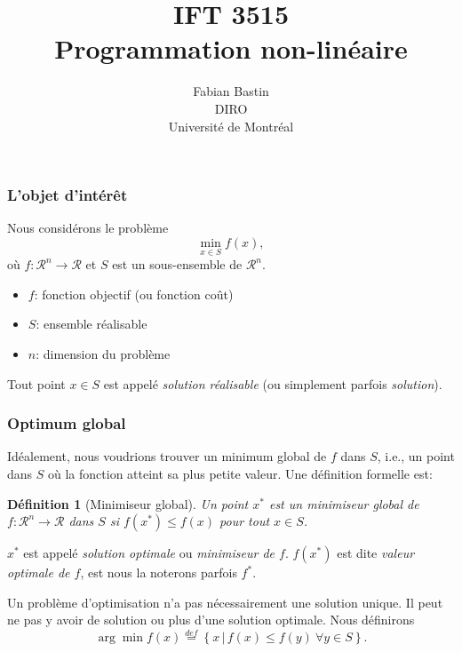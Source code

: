 \documentclass[usepdftitle=false]{beamer}
\title[IFT3515]{IFT 3515\\Programmation non-linéaire}
\author[Fabian Bastin]{Fabian Bastin\\DIRO\\Université de Montréal}
\date{}
\def\red{\color{red}}
\def\rit{\mathcal{R}}
\newtheorem{defn}{Définition}
\begin{document}
\frame{\titlepage}

\begin{frame}
\frametitle{L'objet d'intérêt}

Nous considérons le problème
\[
\min_{x \in S} f(x),
\]
où $f: \rit^n \rightarrow \rit$ et $S$ est un sous-ensemble de $\rit^n$.

\begin{itemize}
\item
$f$: fonction objectif (ou fonction coût)
\item
$S$: ensemble réalisable
\item
$n$: dimension du problème
\end{itemize}

\mbox{}

Tout point $x \in S$ est appelé \textit{solution réalisable} (ou simplement parfois \textit{solution}).

\end{frame}

\begin{frame}
\frametitle{Optimum global}	

Idéalement, nous voudrions trouver un {\red minimum global} de $f$ dans $S$, i.e., un point dans $S$ où la fonction atteint sa plus petite valeur.
Une définition formelle est:
\begin{defn}[Minimiseur global]
Un point $x^*$ est un minimiseur global de $f: \rit^n \rightarrow \rit$ dans $S$ si $f(x^*) \leq f(x)$ pour tout $x \in S$.
\end{defn}

\mbox{}

$x^*$ est appelé {\sl solution optimale} ou {\sl minimiseur de $f$}.
$f(x^*)$ est dite {\sl valeur optimale de $f$}, est nous la noterons parfois $f^*$.

\mbox{}

Un problème d'optimisation n'a pas nécessairement une solution unique.
Il peut ne pas y avoir de solution ou plus d'une solution optimale. Nous définirons
\[
\arg\min f(x) \overset{def}{=} \left\lbrace x \,|\, f(x) \leq f(y)\ \forall y \in S \right\rbrace.
\]

\end{frame}
\end{document}
